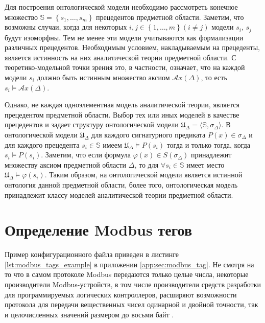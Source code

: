 Для построения онтологической модели необходимо рассмотреть конечное множество 
$\mathbb{S}=\left\{ s_1, \ldots, s_m \right\}$ прецедентов предметной области.
Заметим, что возможны случаи, когда для некоторых $i,j \in \left\{1,\ldots,m\right\} (i\ne j)$
модели $s_i$, $s_j$ будут изоморфны. Тем не менее эти модели учитываются как формализации различных прецедентов.
Необходимым условием, накладываемым на прецеденты, является истинность на них аналитической теории предметной области.
С теоретико-модельной точки зрения это, в частности, означает, что на каждой модели $s_i$ должно быть истинным множество аксиом
$\mathcal{A}x(\Delta)$, то есть $s_i \vDash \mathcal{A}x(\Delta)$.

Однако, не каждая одноэлементная модель аналитической теории, является прецедентом
предметной области. Выбор тех или иных моделей в качестве прецедентов и задает структуру онтологической модели
$\mathfrak{U}_\Delta =\langle \mathbb{S}, \sigma_\Delta \rangle$.
В онтологической модели $\mathfrak{U}_\Delta$ для каждого сигнатурного предиката $P(x) \in \sigma_\Delta$
и для каждого прецедента $s_i \in \mathbb{S}$ имеем $\mathfrak{U}_\Delta \vDash P(s_i)$
тогда и только тогда, когда $s_i \vDash P(s_i)$.
Заметим, что если формула $\varphi(x) \in S(\sigma_\Delta)$ принадлежит множеству аксиом предметной
области $\Delta$, то для $\forall s_i \in \mathbb{S}$  имеет место $\mathfrak{U}_\Delta \vDash\varphi(s_i)$.
Таким образом, на онтологической модели является истинной онтология данной предметной области,
более того, онтологическая модель принадлежит классу моделей аналитической теории предметной области.



\section{Определение Modbus тегов} \label{sec:modbus_tag}
Пример конфигурационного файла приведен в листинге \ref{lst:modbus_tags_example} в приложении \ref{app:sec:modbus_tag}.
Не смотря на то что в самом протоколе Modbus передаются только целые числа, некоторые производители Modbus-устройств,
в том числе производители средств разработки для программируемых логических контроллеров, расширяют возможности протокола
для передачи вещественных чисел одинарной и двойной точности, так и целочисленных значений размером до восьми байт \cite{book:gost:modbus_program_language}.

